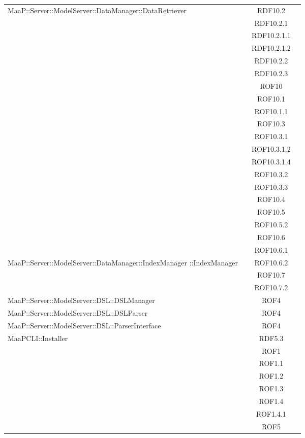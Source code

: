 \begin{center}
\begin{longtable}{|p{0.8\linewidth}|c|}
\midrule
MaaP::Server::ModelServer::DataManager::DataRetriever
& RDF10.2\\
& RDF10.2.1\\
& RDF10.2.1.1\\
& RDF10.2.1.2\\
& RDF10.2.2\\
& RDF10.2.3\\
& ROF10\\
& ROF10.1\\
& ROF10.1.1\\
& ROF10.3\\
& ROF10.3.1\\
& ROF10.3.1.2\\
& ROF10.3.1.4\\
& ROF10.3.2\\
& ROF10.3.3\\
& ROF10.4\\
& ROF10.5\\
& ROF10.5.2\\
& ROF10.6\\
& ROF10.6.1\\

\midrule
MaaP::Server::ModelServer::DataManager::IndexManager ::IndexManager
& ROF10.6.2\\
& ROF10.7\\
& ROF10.7.2\\

\midrule
MaaP::Server::ModelServer::DSL::DSLManager
& ROF4\\

\midrule
MaaP::Server::ModelServer::DSL::DSLParser
& ROF4\\

\midrule
MaaP::Server::ModelServer::DSL::ParserInterface
& ROF4\\

\midrule
MaaPCLI::Installer
& RDF5.3\\
& ROF1\\
& ROF1.1\\
& ROF1.2\\
& ROF1.3\\
& ROF1.4\\
& ROF1.4.1\\
& ROF5\\
\end{longtable}
\end{center}

\newpage
